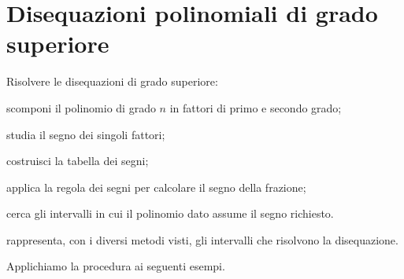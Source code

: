 %  
%
%

\section{Disequazioni polinomiali di grado superiore}
\label{sec:diseq_grado_superiore}

\begin{procedura}
Risolvere le disequazioni di grado superiore:
\begin{enumeratea}
\item scomponi il polinomio di grado \(n\) in fattori di primo e secondo
grado;
\item studia il segno dei singoli fattori;
\item costruisci la tabella dei segni;
\item applica la regola dei segni per calcolare il segno della frazione;
\item cerca gli intervalli in cui il polinomio dato assume il segno richiesto.
\item rappresenta, con i diversi metodi visti, gli intervalli che
 risolvono la disequazione.
\end{enumeratea}
\end{procedura}

Applichiamo la procedura ai seguenti esempi.

\newpage %

